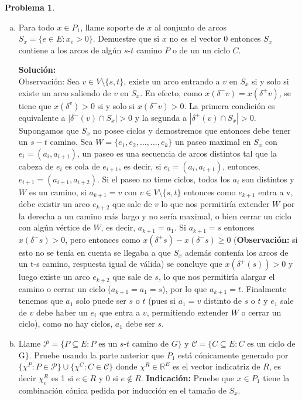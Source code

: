 \documentclass{article}
\newcommand{\RR}{\mathbb R}
\theoremstyle{plain}
\theoremstyle{definition}
\newtheorem{prob}[teo]{Problema}
\theoremstyle{Azul}
\begin{document}
\begin{prob}
\begin{enumerate}[(a)]
\item Para todo $x\in P_{1}$, llame soporte de $x$ al conjunto de arcos $S_x=\{e\in E\colon x_e>0\}$. Demuestre que si $x$ no es el vector 0 entonces $S_x$ contiene a los arcos de algún $s$-$t$ camino $P$ o de un un ciclo $C$.

\textbf{Solución:}\\

Observación: Sea $v \in V\setminus\{s,t\}$, existe un arco entrando a $v$ en $S_x$ si y solo si existe un arco saliendo de $v$ en $S_x$. En efecto, como $x(\delta^-v)=x(\delta^+v)$, se tiene que $x(\delta^v)>0$ si y solo si $x(\delta^-v)>0$. La primera condición es equivalente a $|\delta^-(v) \cap S_x|>0$ y la segunda a $|\delta^+(v)\cap S_x|>0$.\\

Supongamos que $S_{x}$ no posee ciclos y demostremos que entonces debe tener un $s-t$ camino. Sea $W= \{e_{1}, e_{2}, \ldots, ..., e_{k}\}$  un paseo maximal en $S_{x}$ con $e_{i}=(a_{i},a_{i+1})$, un paseo es una secuencia de arcos distintos tal que la cabeza de $e_{i}$ es cola de $e_{i+1}$, es decir, si $e_{i} = (a_{i}, a_{i+1})$, entonces,  $e_{i+1}=(a_{i+1}, a_{i+2})$. Si el paseo no tiene ciclos, todos los $a_{i}$ son distintos y $W$ es un camino, si $a_{k+1}=v$ con $v \in V\setminus\{s,t\}$ entonces como $e_{k+1}$ entra a  v, debe existir un arco $e_{k+2}$ que sale de $v$ lo que nos permitiría  extender $W$ por la derecha a un camino más largo y no sería maximal, o bien cerrar un ciclo con algún vértice de $W$, es decir, $a_{k+1}=a_{1}$. Si $a_{k+1}=s$ entonces $x(\delta^-s)>0$, pero entonces como $x(\delta^+s)-x(\delta^-s)\geq0$ (\textbf{Observación:} si esto no se tenía en cuenta se llegaba a que $S_{x}$ además contenía los arcos de un t-s camino, respuesta igual de válida) se concluye que $x(\delta^+(s))>0$ y luego existe un arco $e_{k+2}$ que sale de $s$, lo que nos permitiría alargar el camino o cerrar un ciclo ($a_{k+1}=a_{1}=s$), por lo que $a_{k+1}=t$. Finalmente tenemos que $a_{1}$ solo puede ser $s$ o $t$ (pues si $a_{1}=v$ distinto de $s$ o $t$ y $e_1$ sale de $v$ debe haber un $e_{i}$ que entra a $v$, permitiendo extender $W$ o cerrar un ciclo), como no hay ciclos, $a_1$ debe ser $s$.

\item Llame $\mathcal{P}=\{P\subseteq E\colon \text{$P$ es un $s$-$t$ camino de $G$}\}$ y $\mathcal{C}=\{C\subseteq E\colon \text{$C$ es un ciclo de } $G$\}$. Pruebe usando la parte anterior que $P_1$ está cónicamente generado por $\{\chi^P\colon P\in \mathcal{P}\}\cup \{\chi^C\colon C\in \mathcal{C}\}$ donde $\chi^R\in \RR^E$ es el vector indicatriz de $R$, es decir $\chi^R_e$ es 1 si $e\in R$ y 0 si $e\not\in R$. \textbf{Indicación:} Pruebe que $x\in P_1$ tiene la combinación cónica pedida por inducción en el tamaño de $S_x$.


\end{enumerate}
\end{prob}
\end{document}
